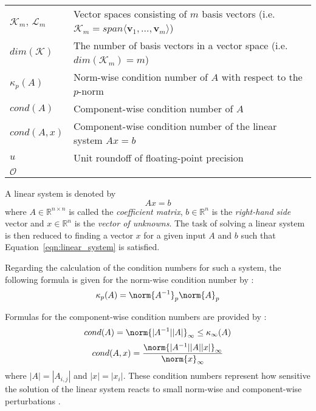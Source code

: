 \begin{tabular}{ll}
  $\mathcal{K}_m$, $\mathcal{L}_m$ & Vector spaces consisting of $m$ basis vectors (i.e. $\mathcal{K}_m=span\langle \bm{v}_1, \dots, \bm{v}_{m} \rangle$) \\
  $dim(\mathcal{K})$ & The number of basis vectors in a vector space (i.e. $dim(\mathcal{K}_m)=m$) \\
  $\kappa_{p}(A)$ & Norm-wise condition number of $A$ with respect to the $p$-norm \\
  $cond(A)$ & Component-wise condition number of $A$ \\
  $cond(A, x)$ & Component-wise condition number of the linear system $Ax=b$ \\
  $u$      & Unit roundoff of floating-point precision \\
  
  $\mathcal{O}$ & \\

\end{tabular}
\vspace{0.5cm}

\noindent A linear system is denoted by
\begin{equation}
\label{eqn:linear_system}
    Ax=b
\end{equation}
\noindent where $A \in \mathbb{R}^{n \times n}$ is called the \textit{coefficient matrix}, $b \in \mathbb{R}^{n}$ is the \textit{right-hand side} vector and $x \in \mathbb{R}^{n}$ is the \textit{vector of unknowns}. The task of solving a linear system is then reduced to finding a vector $x$ for a given input $A$ and $b$ such that Equation~\hyperref[eqn:linear_system]{\ref{eqn:linear_system}} is satisfied.

\noindent Regarding the calculation of the condition numbers for such a system, the following formula is given for the norm-wise condition number by \cite{higham_accuracy_2002}:
\begin{equation}
\kappa_{p}(A) = \norm{A^{-1}}_p\norm{A}_p
\end{equation}

\noindent Formulas for the component-wise condition numbers are provided by \cite{skeel_scaling_1979}:
\begin{equation}
cond(A) = \norm{|A^{-1}||A|}_\infty \leq \kappa_{\infty}(A)
\end{equation}
\begin{equation}
cond(A,x) = \frac{\norm{|A^{-1}||A||x|}_\infty}{\norm{x}_\infty}
\end{equation}
\noindent where $|A| = |A_{i,j}|$ and $|x| = |x_{i}|$. These condition numbers represent how sensitive the solution of the linear system reacts to small norm-wise and component-wise perturbations \cite{higham_accuracy_2002}. 